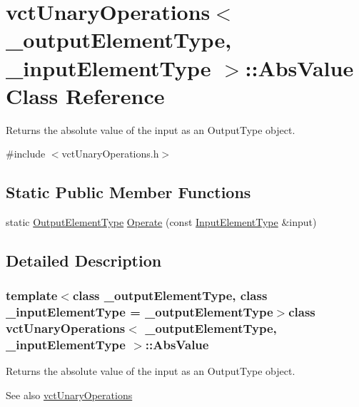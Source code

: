 \hypertarget{classvct_unary_operations_1_1_abs_value}{}\section{vct\+Unary\+Operations$<$ \+\_\+output\+Element\+Type, \+\_\+input\+Element\+Type $>$\+:\+:Abs\+Value Class Reference}
\label{classvct_unary_operations_1_1_abs_value}


Returns the absolute value of the input as an Output\+Type object.  




{\ttfamily \#include $<$vct\+Unary\+Operations.\+h$>$}

\subsection*{Static Public Member Functions}
\begin{DoxyCompactItemize}
\item 
static \hyperlink{classvct_unary_operations_a42306ac3dd20d32c6d6c66ac3fa2e7b9}{Output\+Element\+Type} \hyperlink{classvct_unary_operations_1_1_abs_value_a69b9a718c651443ecc2bf18079d4481f}{Operate} (const \hyperlink{classvct_unary_operations_abf3b77bb7b8abd7ba72a6a45a65696a7}{Input\+Element\+Type} \&input)
\end{DoxyCompactItemize}


\subsection{Detailed Description}
\subsubsection*{template$<$class \+\_\+output\+Element\+Type, class \+\_\+input\+Element\+Type = \+\_\+output\+Element\+Type$>$class vct\+Unary\+Operations$<$ \+\_\+output\+Element\+Type, \+\_\+input\+Element\+Type $>$\+::\+Abs\+Value}

Returns the absolute value of the input as an Output\+Type object. 

\begin{DoxySeeAlso}{See also}
\hyperlink{classvct_unary_operations}{vct\+Unary\+Operations} 
\end{DoxySeeAlso}


